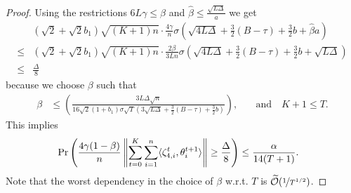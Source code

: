\documentclass[a4paper,11pt]{article}
\begin{document}
\begin{proof}
    Using the restrictions $6L\gamma\le\beta$ and $\hat{\beta} \le \frac{\sqrt{L\Delta}}{a}$ we get
    \begin{align*}
    &(\sqrt{2}+\sqrt{2}b_1)\sqrt{(K+1)n} \cdot \frac{4\gamma}{n}\sigma\left(\sqrt{4L\Delta} +\frac{3}{2}(B-\tau) + \frac{3}{2}b + \hat{\beta}a\right)\\
    \le & (\sqrt{2}+\sqrt{2}b_1)\sqrt{(K+1)n} \cdot \frac{2\beta}{3Ln}\sigma\left(\sqrt{4L\Delta} +\frac{3}{2}(B-\tau) + \frac{3}{2}b + \sqrt{L\Delta}\right)\\
    \le &\frac{\Delta}{8}
    \end{align*}
    because we choose $\beta$ such that
    \begin{align}\label{eq:stepsize_bound_6}
    \beta &\le \left(\frac{3L\Delta\sqrt{n}}{16\sqrt{2}(1+b_1)\sigma\sqrt{T}\left(3\sqrt{L\Delta} +\frac{3}{2}(B-\tau) + \frac{3}{2}b\right)}\right),
    &\quad \text{and} \quad K+1\le T.
    \end{align}
    This implies 
    \begin{align*}
    &\Pr\left(\frac{4\gamma(1-\beta)}{n}\left\|\sum_{t=0}^K\sum_{i=1}^n\<\zeta_{4,i}^t,\theta^{t+1}_i>\right\| \ge \frac{\Delta}{8}\right) \le \frac{\alpha}{14(T+1)}.
    \end{align*}
    Note that the worst dependency in the choice of $\beta$ w.r.t. $T$ is $\widetilde{\mathcal O}(\nicefrac{1}{T^{1/2}})$.



\end{proof}
\end{document}
